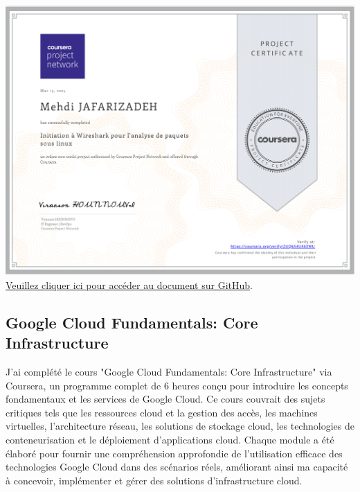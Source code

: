 \documentclass{article}
\begin{document}
        \begin{center}
            \includegraphics[width=\textwidth,height=\textheight,keepaspectratio]{../Document/Certificats de Fin de Cours/Getting Started with Wireshark for Packet Analysis on Linux/Getting Started with Wireshark for Packet Analysis on Linux.pdf}
            \footnotesize
             \href{https://github.com/jafarizadeh/CV---lettre/tree/00df58c41988ba7488536512caee235bdb5d570d/Document/Certificats%20de%20Fin%20de%20Cours/Getting%20Started%20with%20Wireshark%20for%20Packet%20Analysis%20on%20Linux}{Veuillez cliquer ici pour accéder au document sur GitHub}.
        \end{center}

    \newpage
    
 

    \subsection{Google Cloud Fundamentals: Core Infrastructure}
    J'ai complété le cours "Google Cloud Fundamentals: Core Infrastructure" via Coursera, un programme complet de 6 heures conçu pour introduire les concepts fondamentaux et les services de Google Cloud. Ce cours couvrait des sujets critiques tels que les ressources cloud et la gestion des accès, les machines virtuelles, l'architecture réseau, les solutions de stockage cloud, les technologies de conteneurisation et le déploiement d'applications cloud. Chaque module a été élaboré pour fournir une compréhension approfondie de l'utilisation efficace des technologies Google Cloud dans des scénarios réels, améliorant ainsi ma capacité à concevoir, implémenter et gérer des solutions d'infrastructure cloud.
\end{document}
